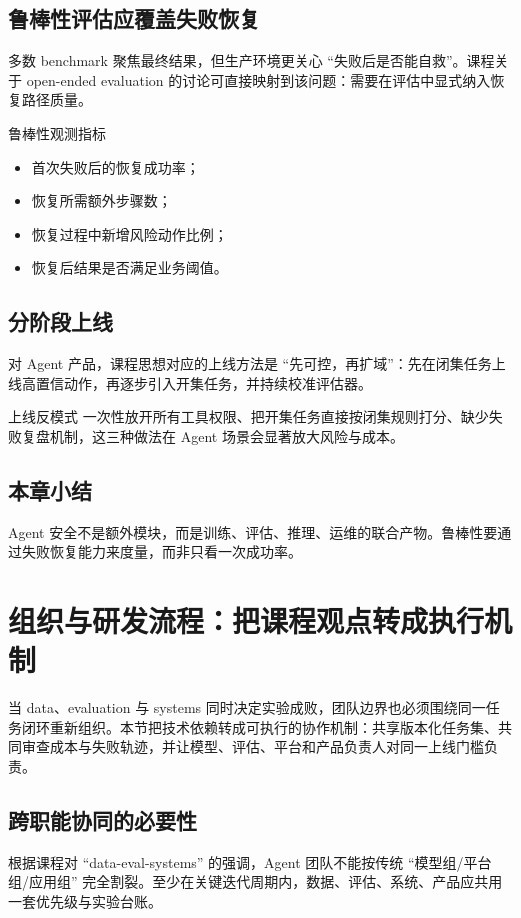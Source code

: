 \documentclass[a4paper]{article}
\begin{document}
\subsection{鲁棒性评估应覆盖失败恢复}
多数 benchmark 聚焦最终结果，但生产环境更关心 ``失败后是否能自救''。课程关于 open-ended evaluation 的讨论可直接映射到该问题：需要在评估中显式纳入恢复路径质量。

\begin{knowledgebox}{鲁棒性观测指标}
\begin{itemize}
    \item 首次失败后的恢复成功率；
    \item 恢复所需额外步骤数；
    \item 恢复过程中新增风险动作比例；
    \item 恢复后结果是否满足业务阈值。
\end{itemize}
\end{knowledgebox}

\subsection{分阶段上线}
对 Agent 产品，课程思想对应的上线方法是 ``先可控，再扩域''：先在闭集任务上线高置信动作，再逐步引入开集任务，并持续校准评估器。

\begin{warningbox}{上线反模式}
一次性放开所有工具权限、把开集任务直接按闭集规则打分、缺少失败复盘机制，这三种做法在 Agent 场景会显著放大风险与成本。
\end{warningbox}

\subsection{本章小结}
Agent 安全不是额外模块，而是训练、评估、推理、运维的联合产物。鲁棒性要通过失败恢复能力来度量，而非只看一次成功率。


\section{组织与研发流程：把课程观点转成执行机制}

当 data、evaluation 与 systems 同时决定实验成败，团队边界也必须围绕同一任务闭环重新组织。本节把技术依赖转成可执行的协作机制：共享版本化任务集、共同审查成本与失败轨迹，并让模型、评估、平台和产品负责人对同一上线门槛负责。

\subsection{跨职能协同的必要性}
根据课程对 ``data-eval-systems'' 的强调，Agent 团队不能按传统 ``模型组/平台组/应用组'' 完全割裂。至少在关键迭代周期内，数据、评估、系统、产品应共用一套优先级与实验台账。
\end{document}

